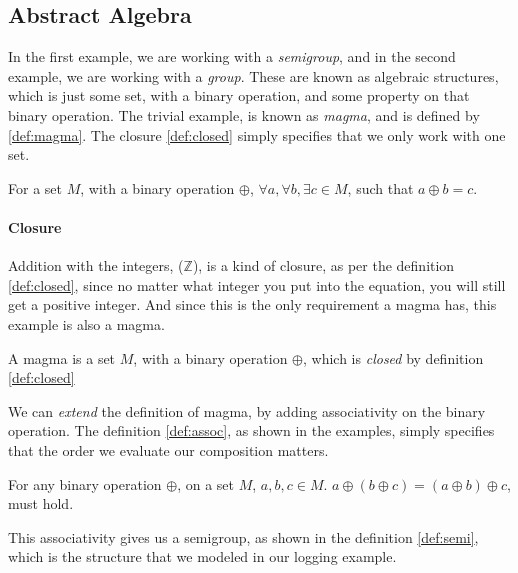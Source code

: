 \subsection{Abstract Algebra}

In the first example, we are working with a \textit{semigroup}, and in the
second example, we are working with a \textit{group}. These are known as
algebraic structures, which is just some set, with a binary operation, and some
property on that binary operation. The trivial example, is known as
\textit{magma}, and is defined by \ref{def:magma}. The closure \ref{def:closed}
simply specifies that we only work with one set.

\begin{definition}[Closure] \label{def:closed}
  For a set $M$, with a binary operation $\oplus$,
  $\forall a, \forall b, \exists c \in M$, such that
  $a \oplus b = c$.
\end{definition}

\paragraph{Closure} Addition with the integers, ($\mathbb{Z}$), is a kind of
  closure, as per the definition \ref{def:closed}, since no matter what integer
  you put into the equation, you will still get a positive integer. And since
  this is the only requirement a magma has, this example is also a magma.

\begin{definition}[Magma] \label{def:magma}
  A magma is a set $M$, with a binary operation $\oplus$, which is
  \textit{closed} by definition \ref{def:closed}
\end{definition}

We can \textit{extend} the definition of magma, by adding associativity on the
binary operation. The definition \ref{def:assoc}, as shown in the examples,
simply specifies that the order we evaluate our composition matters.

\begin{definition} \label{def:assoc}
  For any binary operation $\oplus$, on a set $M$, $a, b, c \in M$.
  $a \oplus \left ( b \oplus c \right ) = \left ( a \oplus b \right ) \oplus c$,
  must hold.
\end{definition}

This associativity gives us a semigroup, as shown in the definition
\ref{def:semi}, which is the structure that we modeled in our logging example.

